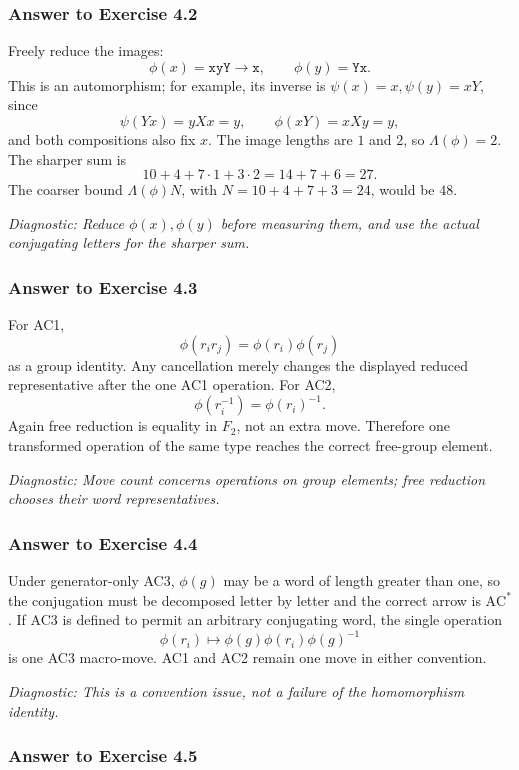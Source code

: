 \documentclass[11pt]{article}
\theoremstyle{definition}
\theoremstyle{remark}
\newcommand{\F}{F_2}
\newcommand{\AC}{\mathrm{AC}}
\newcommand{\diagnostic}[1]{\par\smallskip\textit{Diagnostic: #1}}
\begin{document}
\subsubsection*{Answer to Exercise 4.2}

Freely reduce the images:
\[
\phi(x)=\texttt{xyY}\longrightarrow\texttt{x},
\qquad
\phi(y)=\texttt{Yx}.
\]
This is an automorphism; for example, its inverse is
\(\psi(x)=x,\psi(y)=xY\), since
\[
\psi(Yx)=yXx=y,\qquad \phi(xY)=xXy=y,
\]
and both compositions also fix \(x\).  The image lengths are \(1\) and \(2\), so
\(\Lambda(\phi)=2\).  The sharper sum is
\[
10+4+7\cdot1+3\cdot2
=14+7+6
=\boxed{27}.
\]
The coarser bound \(\Lambda(\phi)N\), with
\(N=10+4+7+3=24\), would be \(48\).

\diagnostic{Reduce \(\phi(x),\phi(y)\) before measuring them, and use the
actual conjugating letters for the sharper sum.}

\subsubsection*{Answer to Exercise 4.3}

For AC1,
\[
\phi(r_ir_j)=\phi(r_i)\phi(r_j)
\]
as a group identity.  Any cancellation merely changes the displayed
reduced representative after the one AC1 operation.  For AC2,
\[
\phi(r_i^{-1})=\phi(r_i)^{-1}.
\]
Again free reduction is equality in \(\F\), not an extra move.  Therefore
one transformed operation of the same type reaches the correct free-group
element.

\diagnostic{Move count concerns operations on group elements; free
reduction chooses their word representatives.}

\subsubsection*{Answer to Exercise 4.4}

Under generator-only AC3, \(\phi(g)\) may be a word of length greater than
one, so the conjugation must be decomposed letter by letter and the correct
arrow is \(\AC^*\).  If AC3 is defined to permit an arbitrary conjugating
word, the single operation
\[
\phi(r_i)\mapsto\phi(g)\phi(r_i)\phi(g)^{-1}
\]
is one AC3 macro-move.  AC1 and AC2 remain one move in either convention.

\diagnostic{This is a convention issue, not a failure of the homomorphism
identity.}

\subsubsection*{Answer to Exercise 4.5}
\end{document}
